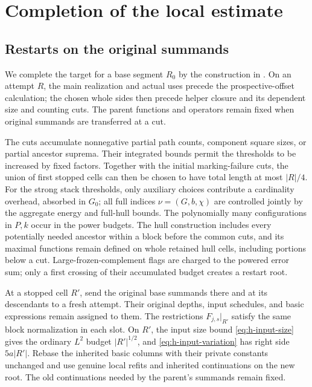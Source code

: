 \section{Completion of the local estimate}
\label{sec:completion}

\subsection{Restarts on the original summands}

We complete the target for a base segment \(R_0\) by the
construction in \cite[Section~10, One attempt and its restarts]{H}.
On an attempt \(R\), the main realization and actual uses precede
the prospective-offset calculation; the chosen whole sides then
precede helper closure and its dependent size and counting cuts.
The parent functions and operators remain fixed when original
summands are transferred at a cut.

The cuts accumulate nonnegative partial path counts, component
square sizes, or partial ancestor suprema.  Their integrated
bounds permit the thresholds to be increased by fixed factors.
Together with the initial marking-failure cuts, the union of first
stopped cells can then be chosen to have total length at most \(|R|/4\).
For the strong stack thresholds, only auxiliary choices contribute
a cardinality overhead, absorbed in \(G_0\); all full indices
\(\nu=(G,b,\chi)\) are controlled jointly by the aggregate energy
and full-hull bounds.  The polynomially many configurations in
\(P,k\) occur in the power budgets.  The hull construction
includes every potentially needed ancestor within a block before
the common cuts, and its maximal functions remain defined on
whole retained hull cells, including portions below a cut.
Large-frozen-complement flags are charged to the powered error
sum; only a first crossing of their accumulated budget creates
a restart root.

At a stopped cell \(R'\), send the original base summands there
and at its descendants to a fresh attempt.  Their original
depths, input schedules, and basic expressions remain assigned
to them.  The restrictions \(F_{j,s}|_{R'}\) satisfy the same
block normalization in each slot.  On \(R'\), the input size bound
\eqref{eq:h-input-size} gives the ordinary \(L^2\) budget
\(|R'|^{1/2}\), and \eqref{eq:h-input-variation} has right side
\(5a|R'|\).  Rebase the inherited basic columns with their
private constants unchanged and use genuine local refits and
inherited continuations on the new root.  The old continuations
needed by the parent's summands remain fixed.

